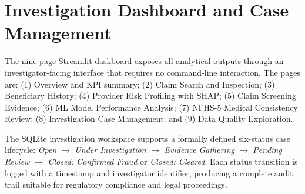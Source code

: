 \section{Investigation Dashboard and Case Management}
\label{sec:dashboard}

The nine-page Streamlit dashboard exposes all analytical outputs through an investigator-facing interface that requires no command-line interaction. The pages are: (1) Overview and KPI summary; (2) Claim Search and Inspection; (3) Beneficiary History; (4) Provider Risk Profiling with SHAP; (5) Claim Screening Evidence; (6) ML Model Performance Analysis; (7) NFHS-5 Medical Consistency Review; (8) Investigation Case Management; and (9) Data Quality Exploration.

The SQLite investigation workspace supports a formally defined six-status case lifecycle: \textit{Open} $\rightarrow$ \textit{Under Investigation} $\rightarrow$ \textit{Evidence Gathering} $\rightarrow$ \textit{Pending Review} $\rightarrow$ \textit{Closed: Confirmed Fraud} or \textit{Closed: Cleared}. Each status transition is logged with a timestamp and investigator identifier, producing a complete audit trail suitable for regulatory compliance and legal proceedings.
